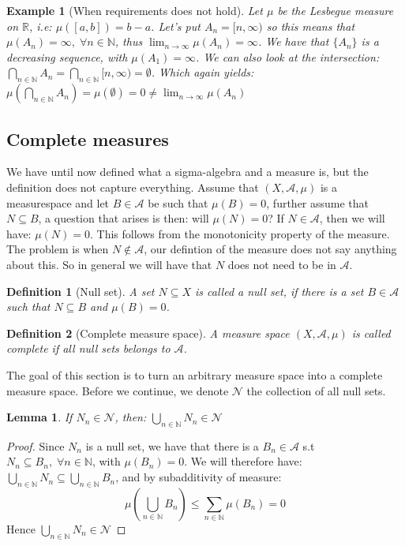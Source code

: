 \documentclass{article}
\newcommand{\R}{\mathbb{R}}
\newcommand{\N}{\mathbb{N}}
\newcommand{\A}{\mathcal{A}}
\newtheorem{definition}{Definition}
\newtheorem{ex}{Example}
\newtheorem{lemma}{Lemma}
\newtheorem{proof}{Proof}
\begin{document}
\begin{ex}[When requirements does not hold]
Let $\mu$ be the Lesbegue measure on $\R$, i.e: $\mu([a,b]) = b-a$. Let's put $A_{n} = [n,\infty)$ so this means that $\mu(A_{n}) = \infty, \; \forall n\in \N$, thus $\lim_{n\to \infty}\mu(A_{n}) = \infty$. We have that $\{A_{n}\}$ is a decreasing sequence, with $\mu(A_{1}) = \infty$. We can also look at the intersection: $\bigcap_{n\in \N}A_{n} = \bigcap_{n\in \N}[n, \infty) = \emptyset$. Which again yields:\\ 
$\mu(\bigcap_{n\in \N}A_{n}) = \mu(\emptyset) = 0 \neq \lim_{n\to \infty}\mu(A_{n})$
\end{ex} 

\subsection{Complete measures}
We have until now defined what a sigma-algebra and a measure is, but the definition does not capture everything. Assume that $(X,\A,\mu)$ is a measurespace and let $B\in \A$ be such that $\mu(B)=0$, further assume that $N\subseteq B$, a question that arises is then: will $\mu(N) = 0$? If $N\in \A$, then we will have: $\mu(N) = 0$. This follows from the monotonicity property of the measure. The problem is when $N\not\in \A$, our defintion of the measure does not say anything about this. So in general we will have that $N$ does not need to be in $\A$. 

\begin{definition}[Null set]
A set $N\subseteq X$ is called a null set, if there is a set $B\in \A$ such that $N\subseteq B$ and $\mu(B) = 0$. 
\end{definition}

\begin{definition}[Complete measure space]
A measure space $(X,\A, \mu)$ is called complete if all null sets belongs to $\A$.
\end{definition}

The goal of this section is to turn an arbitrary measure space into a complete measure space. Before we continue, we denote $\mathcal{N}$ the collection of all null sets.

\begin{lemma}
If $N_{n}\in \mathcal{N}$, then: $\bigcup_{n\in \N}N_{n} \in \mathcal{N}$
\end{lemma}

\begin{proof}
Since $N_{n}$ is a null set, we have that there is a $B_{n}\in \A$ s.t\\ $N_{n}\subseteq B_{n}, \; \forall n\in \N$, with $\mu(B_{n}) = 0$. We will therefore have: $\bigcup_{n\in \N}N_{n} \subseteq \bigcup_{n\in \N}B_{n}$, and by subadditivity of measure: 
\[\mu\left(\bigcup_{n\in \N}B_{n}\right) \leq \sum_{n\in \N}\mu(B_{n}) = 0
\]
Hence $\bigcup_{n\in \N}N_{n} \in \mathcal{N}$
\end{proof}
\end{document}
